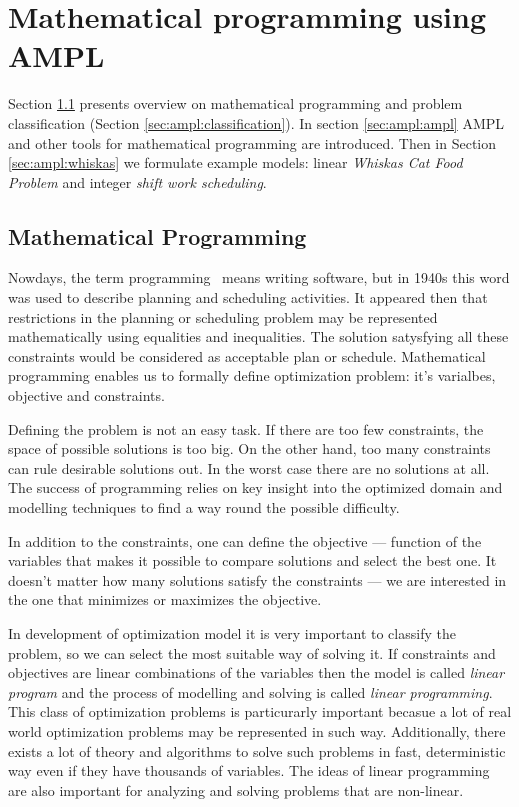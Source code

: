 \chapter{Mathematical programming using AMPL}
\label{chap:ampl} 

Section \ref{sec:ampl:mathprog} presents overview on mathematical programming and problem classification (Section \ref{sec:ampl:classification}). In section \ref{sec:ampl:ampl} AMPL and other tools for mathematical programming are introduced. Then in Section \ref{sec:ampl:whiskas} we formulate example models: linear \emph{Whiskas Cat Food Problem} and integer \emph{shift work scheduling}.

\section{Mathematical Programming}
\label{sec:ampl:mathprog}

Nowdays, the term programming~\cite{Programming} means writing software, but in 1940s this word was used to describe planning and scheduling activities. It appeared then that restrictions in the planning or scheduling problem may be represented mathematically using equalities and inequalities.  The solution satysfying all these constraints would be considered as acceptable plan or schedule.  Mathematical programming enables us to formally define optimization problem: it's varialbes, objective and constraints.

Defining the problem is not an easy task. If there are too few constraints, the space of possible solutions is too big. On the other hand, too many constraints can rule desirable solutions out. In the worst case there are no solutions at all. The success of programming relies on key insight into the optimized domain and modelling techniques to find a way round the possible difficulty. 

In addition to the constraints, one can define the objective --- function of the variables that makes it possible to compare solutions and select the best one. It doesn't matter how many solutions satisfy the constraints --- we are interested in the one that minimizes or maximizes the objective.

In development of optimization model it is very important to classify the problem, so we can select the most suitable way of solving it. If constraints and objectives are linear combinations of the variables then the model is called \emph{linear program} and the process of modelling and solving is called \emph{linear programming}. This class of optimization problems is particurarly important becasue a lot of real world optimization problems may be represented in such way. Additionally, there exists a lot of theory and algorithms to solve such problems in fast, deterministic way even if they have thousands of variables. The ideas of linear programming are also important for analyzing and solving problems that are non-linear.

